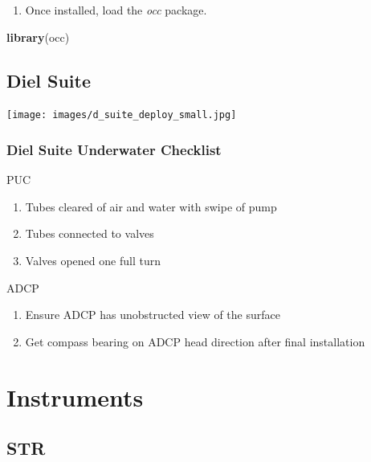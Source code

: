 \documentclass[]{book}
\newenvironment{Shaded}{\begin{snugshade}}{\end{snugshade}}
\newcommand{\KeywordTok}[1]{\textcolor[rgb]{0.13,0.29,0.53}{\textbf{#1}}}
\newcommand{\NormalTok}[1]{#1}
\providecommand{\tightlist}{%
  \setlength{\itemsep}{0pt}\setlength{\parskip}{0pt}}
\begin{document}
\begin{enumerate}
\def\labelenumi{\arabic{enumi}.}
\setcounter{enumi}{2}
\tightlist
\item
  Once installed, load the \emph{occ} package.
\end{enumerate}

\begin{Shaded}
\begin{Highlighting}[]
\KeywordTok{library}\NormalTok{(occ)}
\end{Highlighting}
\end{Shaded}

\hypertarget{dielsuite}{%
\chapter{Diel Suite}\label{dielsuite}}

\texttt{[image: images/d\_suite\_deploy\_small.jpg]}

\hypertarget{diel-suite-underwater-checklist}{%
\section{Diel Suite Underwater Checklist}\label{diel-suite-underwater-checklist}}

PUC

\begin{enumerate}
\def\labelenumi{\arabic{enumi}.}
\tightlist
\item
  Tubes cleared of air and water with swipe of pump
\item
  Tubes connected to valves
\item
  Valves opened one full turn
\end{enumerate}

ADCP

\begin{enumerate}
\def\labelenumi{\arabic{enumi}.}
\tightlist
\item
  Ensure ADCP has unobstructed view of the surface
\item
  Get compass bearing on ADCP head direction after final installation
\end{enumerate}

\hypertarget{part-instruments}{%
\part*{Instruments}\label{part-instruments}}

\hypertarget{str}{%
\chapter{STR}\label{str}}
\end{document}
